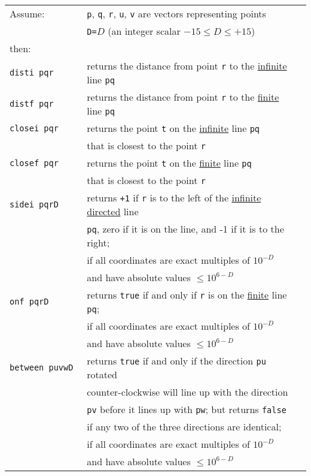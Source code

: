 \documentclass[12pt]{article}
\begin{document}
\begin{center}
\begin{tabular}{l@{~~~~}l@{~~~~}l}
Assume: & {\tt p}, {\tt q}, {\tt r}, {\tt u}, {\tt v}
          are vectors representing points \\
	& {\tt D=}$D$ (an integer scalar $-15\le D\le +15$) \\
then: \\[1ex]
\tt disti~pqr  & returns the distance from point {\tt r} to the
		\underline{infinite} line {\tt pq} \\
\tt distf~pqr  & returns the distance from point {\tt r} to the
		\underline{finite} line {\tt pq} \\
\tt closei~pqr  & returns the point {\tt t} on the \underline{infinite}
                  line {\tt pq} \\
		& that is closest to the point {\tt r} \\
\tt closef~pqr  & returns the point {\tt t} on the \underline{finite}
                  line {\tt pq} \\
		& that is closest to the point {\tt r} \\
\tt sidei~pqrD & returns {\tt +1} if {\tt r} is to the left of the
                \underline{infinite directed} line \\
	      & {\tt pq}, zero if it is on the line,
	        and -1 if it is to the right; \\
	      & if all coordinates are exact multiples of $10^{-D}$ \\
	      & and have absolute values $\le 10^{6-D}$ \\
\tt onf~pqrD & returns {\tt true} if and only if {\tt r} is on the
                \underline{finite} line {\tt pq}; \\
	      & if all coordinates are exact multiples of $10^{-D}$ \\
	      & and have absolute values $\le 10^{6-D}$ \\
\tt between~puvwD & returns {\tt true} if and only if the direction
                   {\tt pu} rotated \\
		 & counter-clockwise will line up with the direction \\
		 & {\tt pv} before it lines up with {\tt pw}; but returns
		   {\tt false} \\
		 & if any two of the three directions are identical; \\
	      & if all coordinates are exact multiples of $10^{-D}$ \\
	      & and have absolute values $\le 10^{6-D}$ \\
\end{tabular}
\end{center}
\end{document}
